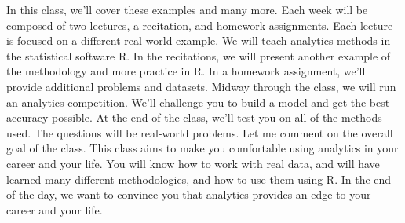 
In this class, we'll cover these examples and many more.
Each week will be composed of two lectures, a recitation,
and homework assignments.
Each lecture is focused on a different real-world example.
We will teach analytics methods in the statistical software
R. In the recitations, we will present
another example of the methodology and more practice
in R. In a homework assignment, we'll
provide additional problems and datasets.
Midway through the class, we will
run an analytics competition.
We'll challenge you to build a model
and get the best accuracy possible.
At the end of the class, we'll test you
on all of the methods used.
The questions will be real-world problems.
Let me comment on the overall goal of the class.
This class aims to make you comfortable using analytics
in your career and your life.
You will know how to work with real data,
and will have learned many different methodologies,
and how to use them using R. In the end of the day,
we want to convince you that analytics provides
an edge to your career and your life.